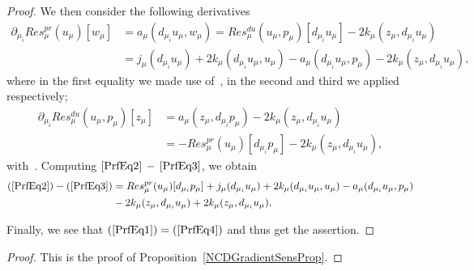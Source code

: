 \begin{proof}
    We then consider the following derivatives
    \begin{align}
        \partial_{\mu_i} Res_\mu^{pr}(u_\mu)[w_\mu] &= a_\mu(d_{\mu_i} u_\mu, w_\mu) = Res_\mu^{du}(u_\mu, p_\mu)[d_{\mu_i} u_\mu] - 2 k_\mu(z_\mu, d_{\mu_i} u_\mu) \label{PrfEq2}\\
        &= j_\mu(d_{\mu_i} u_\mu) + 2 k_\mu(d_{\mu_i} u_\mu, u_\mu) - a_\mu(d_{\mu_i} u_\mu, p_\mu) - 2 k_\mu(z_\mu, d_{\mu_i} u_\mu), \nonumber
    \end{align}
    where in the first equality we made use of~\cite[Proposition 2.5]{Keil2021}, in the second and third we applied~\cite[Equation 3.11 and 2.5]{Keil2021} respectively;
    \begin{align}
        \partial_{\mu_i} Res_\mu^{du}(u_\mu, p_\mu)[z_\mu] &= a_\mu(z_\mu, d_{\mu_i} p_\mu) - 2 k_\mu(z_\mu, d_{\mu_i} u_\mu) \label{PrfEq3}\\
        &= - Res_\mu^{pr}(u_\mu)[d_{\mu_i} p_\mu] - 2 k_\mu(z_\mu, d_{\mu_i} u_\mu), \nonumber
    \end{align}
    with~\cite[Equation 2.6 and 3.10]{Keil2021}.
    Computing $\eqref{PrfEq2}\,-\,\eqref{PrfEq3}$, we obtain
    \begin{align}
        (\ref{PrfEq2}) - (\ref{PrfEq3}) &= Res_\mu^{pr}(u_\mu)[d_{\mu_i} p_\mu] + j_\mu(d_{\mu_i} u_\mu) + 2 k_\mu(d_{\mu_i} u_\mu, u_\mu) - a_\mu(d_{\mu_i} u_\mu, p_\mu) \label{PrfEq4}\\
        &- 2 k_\mu(z_\mu, d_{\mu_i} u_\mu) + 2 k_\mu(z_\mu, d_{\mu_i} u_\mu). \nonumber
    \end{align}

    Finally, we see that $(\ref{PrfEq1}) = (\ref{PrfEq4})$ and thus get the assertion.
\end{proof}

\begin{proof}
    This is the proof of Proposition~\ref{NCDGradientSensProp}.   
\end{proof}